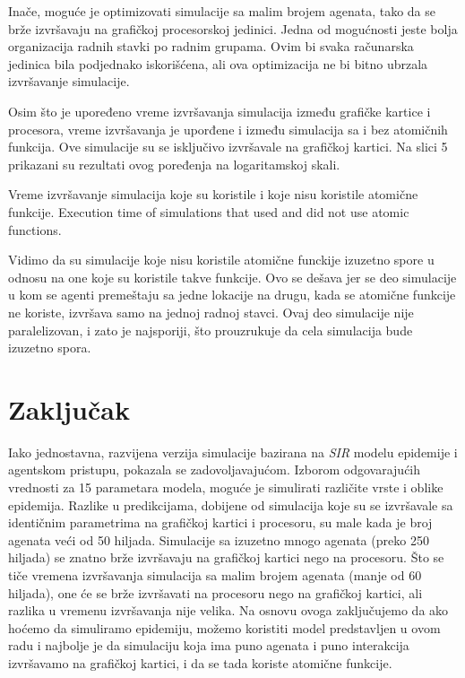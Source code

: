Inače, moguće je optimizovati simulacije sa malim brojem agenata, tako da se brže izvršavaju na grafičkoj procesorskoj jedinici. Jedna od mogućnosti jeste bolja organizacija radnih stavki po radnim grupama. Ovim bi svaka računarska jedinica bila podjednako iskorišćena, ali ova optimizacija ne bi bitno ubrzala izvršavanje simulacije.

Osim što je upoređeno vreme izvršavanja simulacija između grafičke kartice i procesora, vreme izvršavanja je uporđene i između simulacija sa i bez atomičnih funkcija. Ove simulacije su se isključivo izvršavale na grafičkoj kartici. Na slici 5 prikazani su rezultati ovog poređenja na logaritamskoj skali.

    {Vreme izvršavanje simulacija koje su koristile i koje nisu koristile atomične funkcije.}
    {Execution time of simulations that used and did not use atomic functions.}

Vidimo da su simulacije koje nisu koristile atomične funckije izuzetno spore u odnosu na one koje su koristile takve funkcije. Ovo se dešava jer se deo simulacije u kom se agenti premeštaju sa jedne lokacije na drugu, kada se atomične funkcije ne koriste, izvršava samo na jednoj radnoj stavci. Ovaj deo simulacije nije paralelizovan, i zato je najsporiji, što prouzrukuje da cela simulacija bude izuzetno spora.

\section{Zaključak}

Iako jednostavna, razvijena verzija simulacije bazirana na \emph{SIR} modelu epidemije i agentskom pristupu, pokazala se zadovoljavajućom. Izborom odgovarajućih vrednosti za 15 parametara modela, moguće je simulirati različite vrste i oblike epidemija. Razlike u predikcijama, dobijene od simulacija koje su se izvršavale sa identičnim parametrima na grafičkoj kartici i procesoru, su male kada je broj agenata veći od 50 hiljada. Simulacije sa izuzetno mnogo agenata (preko 250 hiljada) se znatno brže izvršavaju na grafičkoj kartici nego na procesoru. Što se tiče vremena izvršavanja simulacija sa malim brojem agenata (manje od 60 hiljada), one će se brže izvršavati na procesoru nego na grafičkoj kartici, ali razlika u vremenu izvršavanja nije velika. Na osnovu ovoga zaključujemo da ako hoćemo da simuliramo epidemiju, možemo koristiti model predstavljen u ovom radu i najbolje je da simulaciju koja ima puno agenata i puno interakcija izvršavamo na grafičkoj kartici, i da se tada koriste atomične funkcije. 

